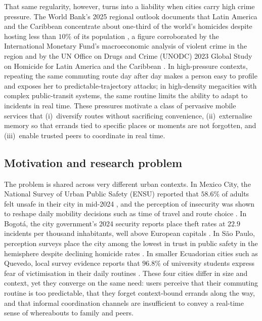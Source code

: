 \documentclass[a4paper,fleqn]{cas-sc}
\begin{document}
	That same regularity, however, turns into a liability when cities carry high crime pressure. The World Bank's 2025 regional outlook documents that Latin America and the Caribbean concentrate about one-third of the world's homicides despite hosting less than $10\%$ of its population \citep{maloney2025worldbank}, a figure corroborated by the International Monetary Fund's macroeconomic analysis of violent crime in the region \citep{bisca2024violent} and by the UN Office on Drugs and Crime (UNODC) 2023 Global Study on Homicide for Latin America and the Caribbean \citep{unodc2023gshlac}. In high-pressure contexts, repeating the same commuting route day after day makes a person easy to profile and exposes her to predictable-trajectory attacks; in high-density megacities with complex public-transit systems, the same routine limits the ability to adapt to incidents in real time. These pressures motivate a class of pervasive mobile services that (i)~diversify routes without sacrificing convenience, (ii)~externalise memory so that errands tied to specific places or moments are not forgotten, and (iii)~enable trusted peers to coordinate in real time.
	
	\subsection{Motivation and research problem}\label{sec:motivation}
	
	The problem is shared across very different urban contexts. In Mexico City, the National Survey of Urban Public Safety (ENSU) reported that $58.6\%$ of adults felt unsafe in their city in mid-2024 \citep{unodc2023gshlac}, and the perception of insecurity was shown to reshape daily mobility decisions such as time of travel and route choice \citep{maloney2025worldbank}. In Bogot\'a, the city government's 2024 security reports place theft rates at $22.9$ incidents per thousand inhabitants, well above European capitals \citep{bisca2024violent}. In S\~ao Paulo, perception surveys place the city among the lowest in trust in public safety in the hemisphere despite declining homicide rates \citep{unodc2023gshlac}. In smaller Ecuadorian cities such as Quevedo, local survey evidence reports that $96.8\%$ of university students express fear of victimisation in their daily routines \citep{tapia2024inseguridad}. These four cities differ in size and context, yet they converge on the same need: users perceive that their commuting routine is too predictable, that they forget context-bound errands along the way, and that informal coordination channels are insufficient to convey a real-time sense of whereabouts to family and peers.
	
\end{document}
